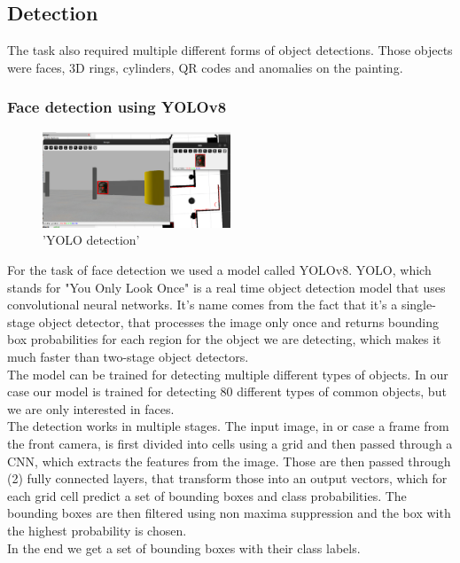 \documentclass[a4paper,
  twoside, %
  headlines=2.1 %
  ]{scrartcl}
\begin{document}
\subsection{Detection}
The task also required multiple different forms of object detections. Those objects were faces, 3D rings, cylinders, QR codes and anomalies on the painting.


\subsubsection{Face detection using YOLOv8}

\begin{figure} %
    \centering
    \includegraphics[width=0.5\textwidth]{YOLO.png}
    \caption{'YOLO detection'}
\end{figure}

For the task of face detection we used a model called YOLOv8. YOLO, which stands for "You Only Look Once" is a real time object detection model that uses convolutional neural networks. It's name comes from the fact that it's a single-stage object detector, that processes the image only once and returns bounding box probabilities for each region for the object we are detecting, which makes it much faster than two-stage object detectors. \\
The model can be trained for detecting multiple different types of objects. In our case our model is trained for detecting 80 different types of common objects, but we are only interested in faces. \\
The detection works in multiple stages. The input image, in or case a frame from the front camera, is first divided into cells using a grid and then passed through a CNN, which extracts the features from the image. Those are then passed through (2) fully connected layers, that transform those into an output vectors, which for each grid cell predict a set of bounding boxes and class probabilities. The bounding boxes are then filtered using non maxima suppression and the box with the highest probability is chosen. \\
In the end we get a set of bounding boxes with their class labels.
\end{document}
